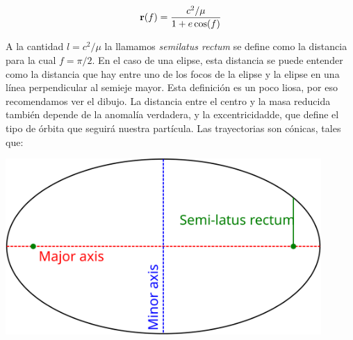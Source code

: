\begin{equation}
	\mathbf{r}(f) = \frac{c^2/\mu}{1+e\cos(f)}
\end{equation}
\hspace{-0.0mm} \vspace{1.0mm} \begin{minipage}{0.55\textwidth}
	A  la cantidad $l=c^2/\mu$ la llamamos \textit{semilatus rectum} se define como la distancia para la cual $f=\pi/2$. En el caso de una elipse, esta distancia se puede entender como la distancia que hay entre uno de los focos de la elipse y la elipse en una línea perpendicular al semieje mayor. Esta definición es un poco liosa, por eso recomendamos ver el dibujo. La distancia entre el centro y la masa reducida también depende de la anomalía verdadera, y la excentricidadde, que define el tipo de órbita que seguirá nuestra partícula. Las trayectorias son cónicas, tales que:
\end{minipage}	\hfill
\begin{minipage}{0.47\textwidth}
	\includegraphics[width=0.9\textwidth]{Cuerpo/Ch_02/02_Semilatus_rectum.png}
\end{minipage}


